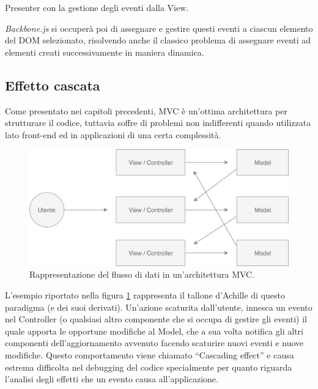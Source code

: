 \begin{listing}[ht]
\inputminted{javascript}{sources/applicationMVCPresenterEvents.js}
\caption{Presenter con la gestione degli eventi dalla View.} 
\label{applicationMVCPresenterEvents} 
\end{listing}

\noindent
\textit{Backbone.js} si occuperà poi di assegnare e gestire questi eventi a ciascun elemento del DOM selezionato, risolvendo anche il classico problema di assegnare eventi ad elementi creati successivamente in maniera dinamica.

\subsection{Effetto cascata}
Come presentato nei capitoli precedenti, MVC è un'ottima architettura per strutturare il codice, tuttavia soffre di problemi non indifferenti quando utilizzata lato front-end ed in applicazioni di una certa complessità.

\begin{figure}[h]
\centering
\vspace*{0.5cm} 
\includegraphics[width=12cm]{./images/MVCDataFlow}
\caption{Rappresentazione del flusso di dati in un'architettura MVC.}
\label{MVCDataFlow}
\vspace*{0.5cm} 
\end{figure}

\noindent
L'esempio riportato nella figura \ref{MVCDataFlow} rappresenta il tallone d'Achille di questo paradigma (e dei suoi derivati). Un'azione scaturita dall'utente, innesca un evento nel Controller (o qualsiasi altro componente che si occupa di gestire gli eventi) il quale apporta le opportune modifiche al Model, che a sua volta notifica gli altri componenti dell'aggiornamento avvenuto facendo scaturire nuovi eventi e nuove modifiche. Questo comportamento viene chiamato “Cascading effect” e causa estrema difficolta nel debugging del codice specialmente per quanto riguarda l'analisi degli effetti che un evento causa all'applicazione.

